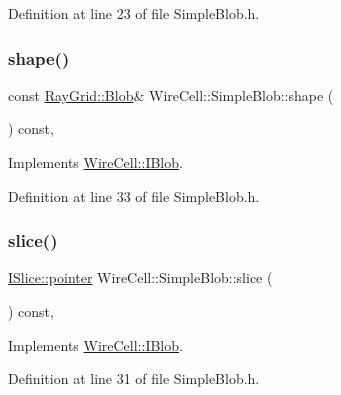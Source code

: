 Definition at line 23 of file Simple\+Blob.\+h.

\mbox{\label{class_wire_cell_1_1_simple_blob_ab681a5c8c24fe4eed58344a7443a1484}} 
\subsubsection{\texorpdfstring{shape()}{shape()}}
{\footnotesize\ttfamily const \hyperlink{class_wire_cell_1_1_ray_grid_1_1_blob}{Ray\+Grid\+::\+Blob}\& Wire\+Cell\+::\+Simple\+Blob\+::shape (\begin{DoxyParamCaption}{ }\end{DoxyParamCaption}) const\hspace{0.3cm}{\ttfamily [inline]}, {\ttfamily [virtual]}}



Implements \hyperlink{class_wire_cell_1_1_i_blob_a241a18f7f178a2021c643ffb6eed6e3f}{Wire\+Cell\+::\+I\+Blob}.



Definition at line 33 of file Simple\+Blob.\+h.

\mbox{\label{class_wire_cell_1_1_simple_blob_a0368534dca8425f5a5ef5498debd97c7}} 
\subsubsection{\texorpdfstring{slice()}{slice()}}
{\footnotesize\ttfamily \hyperlink{class_wire_cell_1_1_i_data_aff870b3ae8333cf9265941eef62498bc}{I\+Slice\+::pointer} Wire\+Cell\+::\+Simple\+Blob\+::slice (\begin{DoxyParamCaption}{ }\end{DoxyParamCaption}) const\hspace{0.3cm}{\ttfamily [inline]}, {\ttfamily [virtual]}}



Implements \hyperlink{class_wire_cell_1_1_i_blob_a92f1e4a99d85edf6c3d8c9abf74b8a19}{Wire\+Cell\+::\+I\+Blob}.



Definition at line 31 of file Simple\+Blob.\+h.

